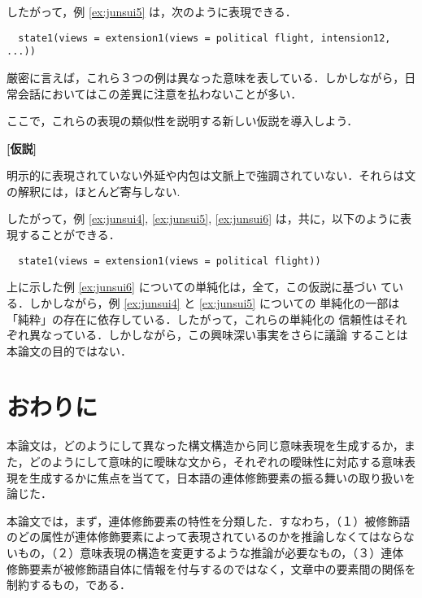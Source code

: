\noindent

したがって，例 \ref{ex:junsui5} は，次のように表現できる．

\begin{verbatim}
  state1(views = extension1(views = political flight, intension12, ...))
\end{verbatim}

厳密に言えば，これら３つの例は異なった意味を表している．しかしながら，日
常会話においてはこの差異に注意を払わないことが多い．

ここで，これらの表現の類似性を説明する新しい仮説を導入しよう．

\vspace{0.5cm}
\begin{flushleft}
{\bf [仮説]}
\end{flushleft}

明示的に表現されていない外延や内包は文脈上で強調されていない．それらは文
の解釈には，ほとんど寄与しない.

したがって，例 \ref{ex:junsui4}, \ref{ex:junsui5},
\ref{ex:junsui6} は，共に，以下のように表現することができる．

\begin{verbatim}
  state1(views = extension1(views = political flight))
\end{verbatim}

上に示した例 \ref{ex:junsui6} についての単純化は，全て，この仮説に基づい
ている．しかしながら，例 \ref{ex:junsui4} と \ref{ex:junsui5} についての
単純化の一部は「純粋」の存在に依存している．したがって，これらの単純化の
信頼性はそれぞれ異なっている．しかしながら，この興味深い事実をさらに議論
することは本論文の目的ではない． 

\section{おわりに}
\label{sec:Conclusion}

本論文は，どのようにして異なった構文構造から同じ意味表現を生成するか，ま
た，どのようにして意味的に曖昧な文から，それぞれの曖昧性に対応する意味表
現を生成するかに焦点を当てて，日本語の連体修飾要素の振る舞いの取り扱いを
論じた． 

本論文では，まず，連体修飾要素の特性を分類した．すなわち，（１）被修飾語
のどの属性が連体修飾要素によって表現されているのかを推論しなくてはならな
いもの，（２）意味表現の構造を変更するような推論が必要なもの，（３）連体
修飾要素が被修飾語自体に情報を付与するのではなく，文章中の要素間の関係を
制約するもの，である． 

